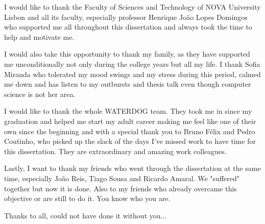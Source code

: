\acknowledgements

I would like to thank the Faculty of Sciences and Technology of NOVA University Lisbon and all its faculty, especially professor Henrique João Lopes Domingos who supported me all throughout this dissertation and always took the time to help and motivate me. 

I would also take this opportunity to thank my family, as they have supported me unconditionally not only during the college years but all my life. I thank Sofia Miranda who tolerated my mood swings and my stress during this period, calmed me down and has listen to my outbursts and thesis talk even though computer science is not her area.

I would like to thank the whole WATERDOG team. They took me in since my graduation and helped me start my adult career making me feel like one of their own since the beginning and with a special thank you to Bruno Félix and Pedro Coutinho, who picked up the slack of the days I've missed work to have time for this dissertation. They are extraordinary and amazing work colleagues.

Lastly, I want to thank my friends who went through the dissertation at the same time, especially João Reis, Tiago Sousa and Ricardo Amaral. We "suffered" together but now it is done. Also to my friends who already overcame this objective or are still to do it. You know who you are.

\vspace{20mm}

Thanks to all, could not have done it without you...